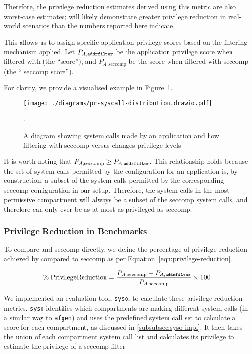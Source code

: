 Therefore, the privilege
reduction estimates derived using this metric are also worst-case estimates;
\af will likely demonstrate greater privilege reduction in real-world
scenarios than the numbers reported here indicate. 

This allows us to assign specific application privilege scores based on the
filtering mechanism applied. Let $P_{A, \text{\texttt{addrfilter}}}$ be the application
privilege score when filtered with \af (the ``\af score''), and 
$P_{A, \text{seccomp}}$ be the score when filtered with seccomp (the ``
seccomp score'').

For clarity, we provide a visualised example in
Figure~\ref{fig:pr}.

\begin{figure}[htbp]
    \centering
    \texttt{[image: ./diagrams/pr-syscall-distribution.drawio.pdf]}
    \caption{A diagram showing system calls made by an application and how
    filtering with seccomp versus \af changes privilege levels}.
    \label{fig:pr}
\end{figure}


It is worth noting that $P_{A, \text{seccomp}} \ge P_{A, \texttt{addrfilter}}$. This
relationship holds because the set of system calls permitted by the \af 
configuration for an application is, by construction, a subset of the system
calls permitted by the corresponding seccomp configuration in our setup.
Therefore, the system calls in the most permissive \af compartment will always
be a subset of the seccomp system calls, and therefore \af can only ever be as at
most as privileged as seccomp.

\subsubsection{Privilege Reduction in Benchmarks}

To compare \af and seccomp directly, we define the percentage of privilege
reduction achieved by \af compared to seccomp as per 
Equation~\ref{eqn:privilege-reduction}.  

\begin{equation}\label{eqn:privilege-reduction}
    \% \: \mathrm{Privilege Reduction} = 
    \frac{P_{A, \text{seccomp}} - P_{A, \text{\texttt{addrfilter}}}}{P_{A, \text{seccomp}}} 
            \times 100
\end{equation}

We implemented an evaluation tool, \texttt{syso}, to calculate these privilege
reduction metrics. \texttt{syso} identifies which compartments are making
different system calls (in a similar way to \texttt{afgen}) and uses the
predefined system call set to calculate a score for each compartment, as
discussed in \ref{subsubsec:syso-impl}. It then takes the union of each
compartment system call list and calculates its privilege to
estimate the privilege of a seccomp filter.


